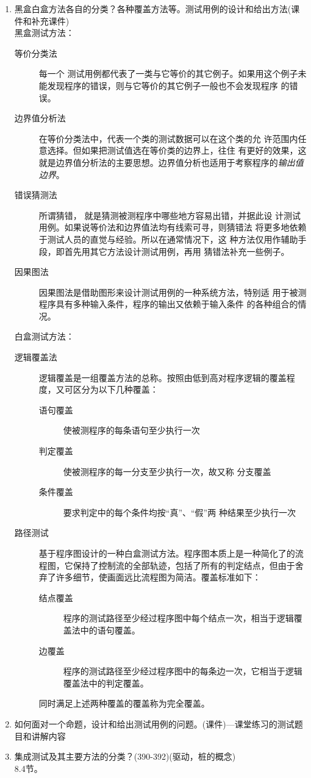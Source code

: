 \documentclass[14pt, letterpaper, UTF8, fontset=windowsnew, heading=true]{article}
\begin{document}
\begin{enumerate}
	\item 黑盒白盒方法各自的分类？各种覆盖方法等。测试用例的设计和给出方法(课件和补充课件) \\
	黑盒测试方法：
	\begin{description}
		\item[等价分类法] 每一个
		测试用例都代表了一类与它等价的其它例子。如果用这个例子未
		能发现程序的错误，则与它等价的其它例子一般也不会发现程序
		的错误。
		\item[边界值分析法] 在等价分类法中，代表一个类的测试数据可以在这个类的允
		许范围内任意选择。但如果把测试值选在等价类的边界上，往住
		有更好的效果，这就是边界值分析法的主要思想。边界值分析也适用于考察程序的\emph{输出值边界}。 
		\item[错误猜测法] 所谓猜错， 就是猜测被测程序中哪些地方容易出错，并据此设
		计测试用例。如果说等价法和边界值法均有线索可寻，则猜错法
		将更多地依赖于测试人员的直觉与经验。所以在通常情况下，这
		种方法仅用作辅助手段，即首先用其它方法设计测试用例，再用
		猜错法补充一些例子。
		\item[因果图法] 因果图法是借助图形来设计测试用例的一种系统方法，特别适
		用于被测程序具有多种输入条件，程序的输出又依赖于输入条件
		的各种组合的情况。
	\end{description}
	白盒测试方法：
	\begin{description}
		\item[逻辑覆盖法] 逻辑覆盖是一组覆盖方法的总称。按照由低到高对程序逻辑的覆盖程度，又可区分为以下几种覆盖：
		\begin{description}
			\item[语句覆盖] 使被测程序的每条语句至少执行一次
			\item[判定覆盖] 使被测程序的每一分支至少执行一次，故又称
			分支覆盖
			\item[条件覆盖] 要求判定中的每个条件均按“真”、“假”两
			种结果至少执行一次
		\end{description}
	
		\item[路径测试] 基于程序图设计的一种白盒测试方法。程序图本质上是一种简化了的流程图，它保持了控制流的全部轨迹，包括了所有的判定结点，但由于舍弃了许多细节，使画面远比流程图为简洁。覆盖标准如下：
		\begin{description}
			\item[结点覆盖] 程序的测试路径至少经过程序图中每个结点一次，相当于逻辑覆盖法中的语句覆盖。
			\item[边覆盖] 程序的测试路径至少经过程序图中的每条边一次，它相当于逻辑覆盖法中的判定覆盖。
		\end{description}
		同时满足上述两种覆盖的覆盖称为完全覆盖。
		
	\end{description}

	\item 如何面对一个命题，设计和给出测试用例的问题。(课件)---课堂练习的测试题目和讲解内容
	
	\item 集成测试及其主要方法的分类？(390-392)(驱动，桩的概念) \\
	8.4节。
	
\end{enumerate}
\end{document}
